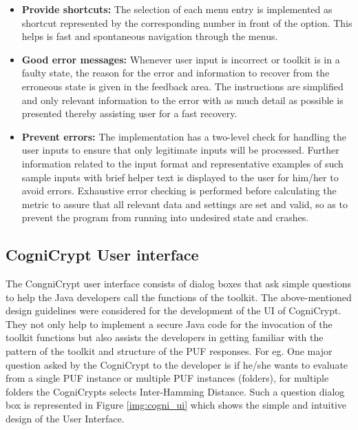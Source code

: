 \begin{itemize}
	\item \textbf{Provide shortcuts:} The selection of each menu entry is implemented as shortcut represented by the corresponding number in front of the option. This helps is fast and spontaneous navigation through the menus.
	\item \textbf{Good error messages:} Whenever user input is incorrect or toolkit is in a faulty state, the reason for the error and information to recover from the erroneous state is given in the feedback area. The instructions are simplified and only relevant information to the error with as much detail as possible is presented thereby assisting user for a fast recovery.
	\item \textbf{Prevent errors:} The implementation has a two-level check for handling the user inputs to ensure that only legitimate inputs will be processed. Further information related to the input format and representative examples of such sample inputs with brief helper text is displayed to the user for him/her to avoid errors. Exhaustive error checking is performed before calculating the metric to assure that all relevant data and settings are set and valid, so as to prevent
		the program from running into undesired state and crashes.
\end{itemize}

\subsection{CogniCrypt User interface}
The CongniCrypt user interface consists of dialog boxes that ask simple questions to help the Java developers call the functions of the toolkit.
The above-mentioned design guidelines were considered for the development of the UI of CogniCrypt. They not only help to implement a secure Java code for the invocation of the toolkit functions but also assists the developers in getting familiar with the pattern of the toolkit and structure of the PUF responses. For eg. One major question asked by the CogniCrypt to the developer is if he/she wants to evaluate from a single PUF instance or multiple PUF instances (folders), for multiple
folders the CogniCrypts selects Inter-Hamming Distance. Such a question dialog box is represented in Figure \ref{img:cogni_ui} which shows the simple and intuitive design of the User Interface.\\

